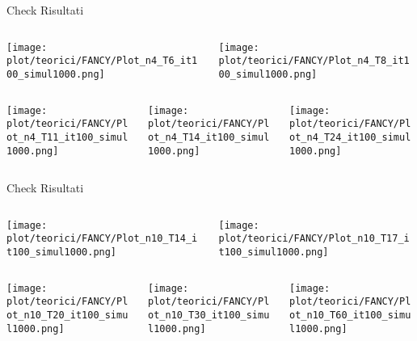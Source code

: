 \documentclass{beamer}
\newcommand{\1}{\mathbbm{1}}
\begin{document}
\begin{frame}{Check Risultati}
\begin{columns}
\begin{column}{0.5\linewidth}
\texttt{[image: plot/teorici/FANCY/Plot\_n4\_T6\_it100\_simul1000.png]}
\end{column}
\begin{column}{0.5\linewidth}
\texttt{[image: plot/teorici/FANCY/Plot\_n4\_T8\_it100\_simul1000.png]}
\end{column}
\end{columns}
\begin{columns}
\begin{column}{0.33\linewidth}
\texttt{[image: plot/teorici/FANCY/Plot\_n4\_T11\_it100\_simul1000.png]}
\end{column}
\begin{column}{0.33\linewidth}
\texttt{[image: plot/teorici/FANCY/Plot\_n4\_T14\_it100\_simul1000.png]}
\end{column}
\begin{column}{0.33\linewidth}
\texttt{[image: plot/teorici/FANCY/Plot\_n4\_T24\_it100\_simul1000.png]}
\end{column}
\end{columns}
\end{frame}

\begin{frame}{Check Risultati}
\begin{columns}
\begin{column}{0.5\linewidth}
\texttt{[image: plot/teorici/FANCY/Plot\_n10\_T14\_it100\_simul1000.png]}
\end{column}
\begin{column}{0.5\linewidth}
\texttt{[image: plot/teorici/FANCY/Plot\_n10\_T17\_it100\_simul1000.png]}
\end{column}
\end{columns}
\begin{columns}
\begin{column}{0.33\linewidth}
\texttt{[image: plot/teorici/FANCY/Plot\_n10\_T20\_it100\_simul1000.png]}
\end{column}
\begin{column}{0.33\linewidth}
\texttt{[image: plot/teorici/FANCY/Plot\_n10\_T30\_it100\_simul1000.png]}
\end{column}
\begin{column}{0.33\linewidth}
\texttt{[image: plot/teorici/FANCY/Plot\_n10\_T60\_it100\_simul1000.png]}
\end{column}
\end{columns}
\end{frame}
\end{document}
